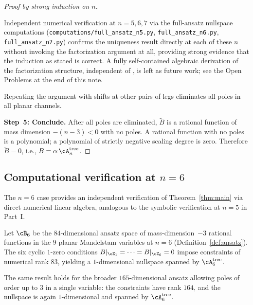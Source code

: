 \begin{proof}[Proof by strong induction on $n$]
\begin{remark}
Independent numerical verification at $n = 5, 6, 7$
via the full-ansatz nullspace computations
(\texttt{computations/full\_ansatz\_n5.py},
\texttt{full\_ansatz\_n6.py},
\texttt{full\_ansatz\_n7.py})
confirms the uniqueness result directly at each of these
$n$ without invoking the factorization argument at all,
providing strong evidence that the induction as stated
is correct.
A fully self-contained algebraic derivation of the
factorization structure, independent of
\cite{Rodina2024}, is left as future work; see the
Open Problems at the end of this note.
\end{remark}

Repeating the argument with shifts at other pairs of
legs eliminates all poles in all planar channels.

\medskip
\noindent\textbf{Step~5: Conclude.}
After all poles are eliminated, $\widetilde{B}$ is a rational
function of mass dimension $-(n-3) < 0$ with no poles.
A rational function with no poles is a polynomial; a
polynomial of strictly negative scaling degree is zero.
Therefore $\widetilde{B} = 0$, i.e., $B = \alpha\,
\cA_n^{\mathrm{tree}}$.
\end{proof}

\subsection{Computational verification at $n = 6$}
\label{ssec:n6}

The $n = 6$ case provides an independent verification of
Theorem~\ref{thm:main} via direct numerical linear algebra,
analogous to the symbolic verification at $n = 5$ in Part~I.

\begin{proposition}[Numerical verification, $n = 6$]
\label{prop:n6}
Let $\cB_6$ be the $84$-dimensional ansatz space of
mass-dimension~$-3$ rational functions in the $9$ planar
Mandelstam variables at $n = 6$ (Definition~\ref{def:ansatz}).
The six cyclic $1$-zero conditions
$B|_{\cZ_1} = \cdots = B|_{\cZ_6} = 0$ impose constraints
of numerical rank $83$, yielding a $1$-dimensional
nullspace spanned by $\cA_6^{\mathrm{tree}}$.

The same result holds for the broader $165$-dimensional
ansatz allowing poles of order up to $3$ in a single
variable: the constraints have rank $164$, and the
nullspace is again $1$-dimensional and spanned by
$\cA_6^{\mathrm{tree}}$.
\end{proposition}

